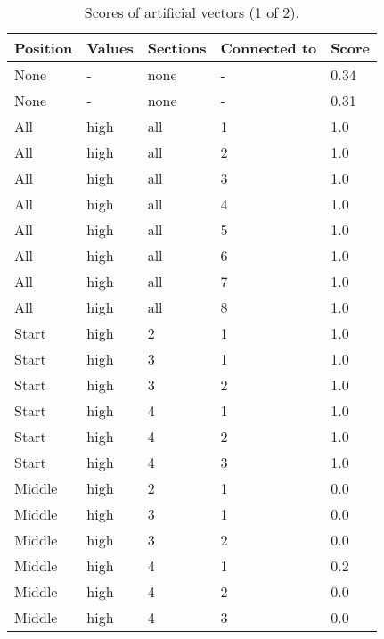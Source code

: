 \begin{table}[!ht]
    \begin{tabular}{l|l|l|l|l}
    \centering
    \captionsetup{justification=centering}
    \hline
        \textbf{Position} & \textbf{Values} & \textbf{Sections} & \textbf{Connected to} & \textbf{Score}  \\ \hline
None & - & none & - & 0.34\\ \hline
None & - & none & - & 0.31\\ \hline
All & high & all & 1 & 1.0\\ \hline
All & high & all & 2 & 1.0\\ \hline
All & high & all & 3 & 1.0\\ \hline
All & high & all & 4 & 1.0\\ \hline
All & high & all & 5 & 1.0\\ \hline
All & high & all & 6 & 1.0\\ \hline
All & high & all & 7 & 1.0\\ \hline
All & high & all & 8 & 1.0\\ \hline
Start & high & 2 & 1 & 1.0\\ \hline
Start & high & 3 & 1 & 1.0\\ \hline
Start & high & 3 & 2 & 1.0\\ \hline
Start & high & 4 & 1 & 1.0\\ \hline
Start & high & 4 & 2 & 1.0\\ \hline
Start & high & 4 & 3 & 1.0\\ \hline
Middle & high & 2 & 1 & 0.0\\ \hline
Middle & high & 3 & 1 & 0.0\\ \hline
Middle & high & 3 & 2 & 0.0\\ \hline
Middle & high & 4 & 1 & 0.2\\ \hline
Middle & high & 4 & 2 & 0.0\\ \hline
Middle & high & 4 & 3 & 0.0\\ \hline
        \end{tabular}
    \caption{Scores of artificial vectors (1 of 2).}
    \label{tabInsightModel1}
\end{table}

